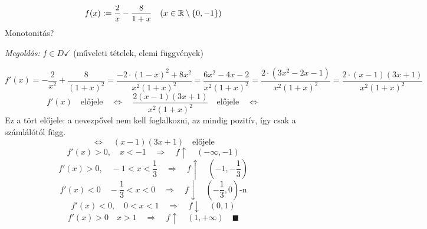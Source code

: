 \documentclass[a4paper,11.5pt]{article}
\begin{document}
	\begin{task}
		\[ f(x):=\frac{2}{x}-\frac{8}{1+x}\quad (x\in\mathbb{R}\setminus\{0,-1\}) \]
		Monotonitás?
		
		\textit{Megoldás:} $f\in D\checkmark$ (műveleti tételek, elemi függvények)
		
		\[ f'(x)=-\frac{2}{x^2}+\frac{8}{(1+x)^2}=\frac{-2\cdot(1-x)^2+8x^2}{x^2(1+x)^2}  =\frac{6x^2-4x-2}{x^2(1+x)^2}=\frac{2\cdot(3x^2-2x-1)}{x^2(1+x)^2}=\frac{2\cdot(x-1)(3x+1)}{x^2(1+x)^2} \]
		\[ f'(x)\quad \text{előjele}\quad \Leftrightarrow\quad \frac{2(x-1)(3x+1)}{x^2(1+x)^2}\quad \text{előjele}\quad \Leftrightarrow \]
		Ez a tört előjele: a nevezpővel nem kell foglalkozni, az mindig pozitív, így csak a számlálótól függ.
		\[ \Leftrightarrow\quad (x-1)(3x+1)\quad \text{előjele} \]
		\[ f'(x)>0,\quad x<-1\quad \Rightarrow\quad f\uparrow\quad (-\infty,-1) \]
		\[ f'(x)>0,\quad -1<x<\frac{1}{3}\quad \Rightarrow\quad f\uparrow\quad \left(-1,-\frac{1}{3}\right) \]
		\[ f'(x)<0\quad -\frac{1}{3}<x<0\quad \Rightarrow\quad f\downarrow\quad \left(-\frac{1}{3},0\right)\text{-n} \]
		\[ f'(x)<0,\quad 0<x<1\quad \Rightarrow\quad f\downarrow\quad (0,1) \]
		\[ f'(x)>0\quad x>1\quad \Rightarrow\quad f\uparrow\quad (1,+\infty)\quad \blacksquare \] 
	\end{task}
\end{document}
